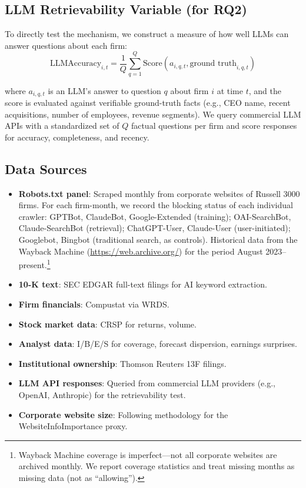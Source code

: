\documentclass[12pt,a4paper]{article}
\begin{document}
\subsection{LLM Retrievability Variable (for RQ2)}

To directly test the mechanism, we construct a measure of how well LLMs can answer questions about each firm:
\begin{equation}
\text{LLMAccuracy}_{i,t} = \frac{1}{Q}\sum_{q=1}^{Q} \text{Score}(a_{i,q,t}, \text{ground truth}_{i,q,t})
\end{equation}

\noindent where $a_{i,q,t}$ is an LLM's answer to question $q$ about firm $i$ at time $t$, and the score is evaluated against verifiable ground-truth facts (e.g., CEO name, recent acquisitions, number of employees, revenue segments). We query commercial LLM APIs with a standardized set of $Q$ factual questions per firm and score responses for accuracy, completeness, and recency.

\subsection{Data Sources}

\begin{itemize}
    \item \textbf{Robots.txt panel}: Scraped monthly from corporate websites of Russell 3000 firms. For each firm-month, we record the blocking status of each individual crawler: GPTBot, ClaudeBot, Google-Extended (training); OAI-SearchBot, Claude-SearchBot (retrieval); ChatGPT-User, Claude-User (user-initiated); Googlebot, Bingbot (traditional search, as controls). Historical data from the Wayback Machine (\url{https://web.archive.org/}) for the period August 2023--present.\footnote{Wayback Machine coverage is imperfect---not all corporate websites are archived monthly. We report coverage statistics and treat missing months as missing data (not as ``allowing'').}
    \item \textbf{10-K text}: SEC EDGAR full-text filings for AI keyword extraction.
    \item \textbf{Firm financials}: Compustat via WRDS.
    \item \textbf{Stock market data}: CRSP for returns, volume.
    \item \textbf{Analyst data}: I/B/E/S for coverage, forecast dispersion, earnings surprises.
    \item \textbf{Institutional ownership}: Thomson Reuters 13F filings.
    \item \textbf{LLM API responses}: Queried from commercial LLM providers (e.g., OpenAI, Anthropic) for the retrievability test.
    \item \textbf{Corporate website size}: Following \citet{BoullandBourveauBreuer2025} methodology for the WebsiteInfoImportance proxy.
\end{itemize}
\end{document}

